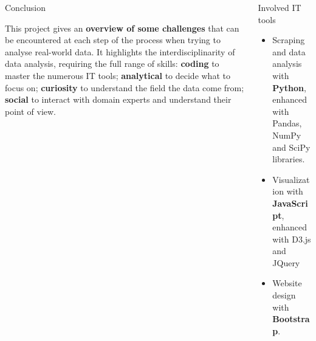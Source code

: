 \documentclass[final]{beamer}
\newlength{\onecolwid}
\newlength{\twocolwid}
\begin{document}
\begin{frame}[t]
\begin{columns}[t]
\begin{column}{\twocolwid}
\begin{columns}[t,totalwidth=\twocolwid]
\begin{column}{\onecolwid}

\begin{block}{Conclusion}

This project gives an \textbf{overview of some challenges} that can be encountered at each step of the process when trying to analyse real-world data. It highlights the interdisciplinarity of data analysis, requiring the full range of skills: \textbf{coding} to master the numerous IT tools; \textbf{analytical} to decide what to focus on; \textbf{curiosity} to understand the field the data come from; \textbf{social} to interact with domain experts and understand their point of view.

\end{block}


\end{column} %

\begin{column}{\onecolwid} %


\begin{block}{Involved IT tools}

\begin{itemize}
\item Scraping and data analysis with \textbf{Python}, enhanced with Pandas, NumPy and SciPy libraries.
\item Visualization with \textbf{JavaScript}, enhanced with D3.js and JQuery
\item Website design with \textbf{Bootstrap}.
\end{itemize}


%

\end{block}



\end{column}
\end{columns}
\end{column}
\end{columns}
\end{frame}
\end{document}
